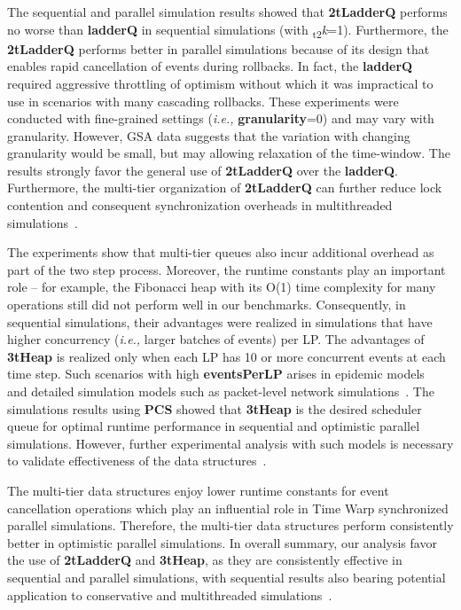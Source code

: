 The sequential and parallel simulation results showed that
\textbf{2tLadderQ} performs no worse than \textbf{ladderQ} in sequential
simulations (with \textsubscript{t2}\textit{k}=1).  Furthermore, the \textbf{2tLadderQ} performs
better in parallel simulations because of its design that enables
rapid cancellation of events during rollbacks.  In fact, the
\textbf{ladderQ} required aggressive throttling of optimism without which
it was impractical to use in scenarios with many cascading rollbacks.
These experiments were conducted with fine-grained settings (\textit{i.e.,}
\textbf{granularity}=0) and may vary with granularity.  However, GSA data
suggests that the variation with changing granularity would be small,
but may allowing relaxation of the time-window.  The results strongly
favor the general use of \textbf{2tLadderQ} over the \textbf{ladderQ}.
Furthermore, the multi-tier organization of \textbf{2tLadderQ} can further
reduce lock contention and consequent synchronization overheads in
multithreaded simulations~\cite{higiro2017multi}.

The experiments show that multi-tier queues also incur additional
overhead as part of the two step process.  Moreover, the runtime
constants play an important role -- for example, the Fibonacci heap
with its O(1) time complexity for many operations still did not
perform well in our benchmarks.  Consequently, in sequential
simulations, their advantages were realized in simulations that have
higher concurrency (\textit{i.e.,} larger batches of events) per LP.
The advantages of \textbf{3tHeap} is realized only when each
LP has 10 or more concurrent events at each time step. Such scenarios
with high \textbf{eventsPerLP} arises in epidemic models~\cite{yeom-14} and
detailed simulation models such as packet-level network
simulations~\cite{tang-05}. The simulations results using \textbf{PCS} showed that \textbf{3tHeap} is the desired scheduler queue for optimal runtime performance in sequential and optimistic parallel simulations.  However, further experimental analysis
with such models is necessary to validate effectiveness of the data
structures~\cite{higiro2017multi}.

The multi-tier data structures enjoy lower runtime constants for event
cancellation operations which play an influential role in Time Warp
synchronized parallel simulations.  Therefore, the multi-tier data
structures perform consistently better in optimistic parallel
simulations.  In overall summary, our analysis favor the use of \textbf{2tLadderQ} and \textbf{3tHeap}, as they are consistently effective in sequential and parallel simulations, with sequential results also bearing potential application to conservative and multithreaded simulations~\cite{higiro2017multi}.


